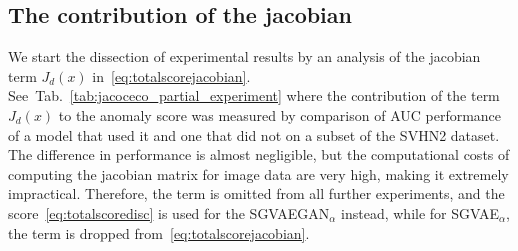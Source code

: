 \subsection{The contribution of the jacobian} \label{sec:jacobian_contribution}

We start the dissection of experimental results by an analysis of the jacobian term $J_d(x)$ in~\eqref{eq:totalscorejacobian}. See~Tab.~\ref{tab:jacoceco_partial_experiment} where the contribution of the term $J_d(x)$ to the anomaly score was measured by comparison of AUC performance of a model that used it and one that did not on a subset of the SVHN2 dataset. The difference in performance is almost negligible, but the computational costs of computing the jacobian matrix for image data are very high, making it extremely impractical. Therefore, the term is omitted from all further experiments, and the score~\eqref{eq:totalscoredisc} is used for the SGVAEGAN$_{\alpha}$ instead, while for SGVAE$_\alpha$, the term is dropped from~\eqref{eq:totalscorejacobian}.

